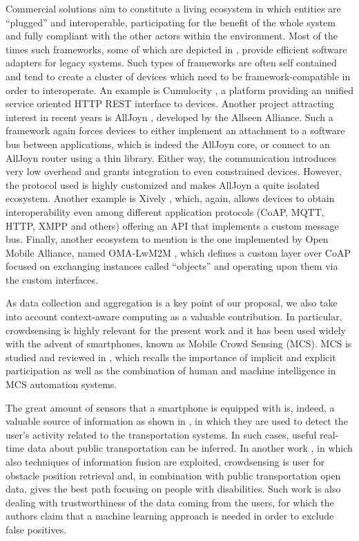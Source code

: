 Commercial solutions aim to constitute a living ecosystem in which entities are ``plugged'' and interoperable, participating for the benefit of the whole system and fully compliant with the other actors within the environment.
Most of the times such frameworks, some of which are depicted in \cite{derhamy2015survey}, provide efficient software adapters for legacy systems.
Such types of frameworks are often self contained and tend to create a cluster of devices which need to be framework-compatible in order to interoperate.
An example is Cumulocity \cite{cumulocity}, a platform providing an unified service oriented HTTP REST interface to devices.
Another project attracting interest in recent years is AllJoyn \cite{alljoyn}, developed by the Allseen Alliance.
Such a framework again forces devices to either implement an attachment to a software bus between applications, which is indeed the AllJoyn core, or connect to an AllJoyn router using a thin library.
Either way, the communication introduces very low overhead and grants integration to even constrained devices.
However, the protocol used is highly customized and makes AllJoyn a quite isolated ecosystem.
Another example is Xively \cite{xively}, which, again, allows devices to obtain interoperability even among different application protocols (CoAP, MQTT, HTTP, XMPP and others) offering an API that implements a custom message bus.
Finally, another ecosystem to mention is the one implemented by Open Mobile Alliance, named OMA-LwM2M \cite{omalwm2m}, which defines a custom layer over CoAP focused on exchanging instances called ``objects'' and operating upon them via the custom interfaces.

As data collection and aggregation is a key point of our proposal, we also take into account context-aware computing as a valuable contribution.
In particular, crowdsensing is highly relevant for the present work and it has been used widely with the advent of smartphones, known as Mobile Crowd Sensing (MCS).
MCS is studied and reviewed in \cite{Guo2014}, which recalls the importance of implicit and explicit participation as well as the combination of human and machine intelligence in MCS automation systems. 

The great amount of sensors that a smartphone is equipped with is, indeed, a valuable source of information as shown in \cite{Bedogni2012}, in which they are used to detect the user's activity related to the transportation systems.
In such cases, useful real-time data about public transportation can be inferred.
In another work \cite{Mirri2014}, in which also techniques of information fusion are exploited, crowdsensing is user for obstacle position retrieval and, in combination with public transportation open data, gives the best path focusing on people with disabilities.
Such work is also dealing with trustworthiness of the data coming from the users, for which the authors claim that a machine learning approach is needed in order to exclude false positives.

